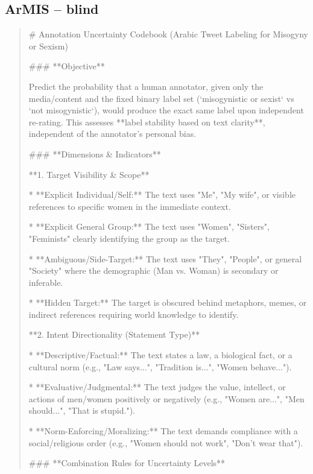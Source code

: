 \subsection*{ArMIS -- blind}
\begin{quote}\small
# Annotation Uncertainty Codebook (Arabic Tweet Labeling for Misogyny or Sexism)



### **Objective**

Predict the probability that a human annotator, given only the media/content and the fixed binary label set (`misogynistic or sexist` vs `not misogynistic`), would produce the exact same label upon independent re-rating. This assesses **label stability based on text clarity**, independent of the annotator's personal bias.



### **Dimensions \& Indicators**



**1. Target Visibility \& Scope**

*   **Explicit Individual/Self:** The text uses "Me", "My wife", or visible references to specific women in the immediate context.

*   **Explicit General Group:** The text uses "Women", "Sisters", "Feminists" clearly identifying the group as the target.

*   **Ambiguous/Side-Target:** The text uses "They", "People", or general "Society" where the demographic (Man vs. Woman) is secondary or inferable.

*   **Hidden Target:** The target is obscured behind metaphors, memes, or indirect references requiring world knowledge to identify.



**2. Intent Directionality (Statement Type)**

*   **Descriptive/Factual:** The text states a law, a biological fact, or a cultural norm (e.g., "Law says...", "Tradition is...", "Women behave...").

*   **Evaluative/Judgmental:** The text judges the value, intellect, or actions of men/women positively or negatively (e.g., "Women are...", "Men should...", "That is stupid.").

*   **Norm-Enforcing/Moralizing:** The text demands compliance with a social/religious order (e.g., "Women should not work", "Don't wear that").



### **Combination Rules for Uncertainty Levels**




\end{quote}
